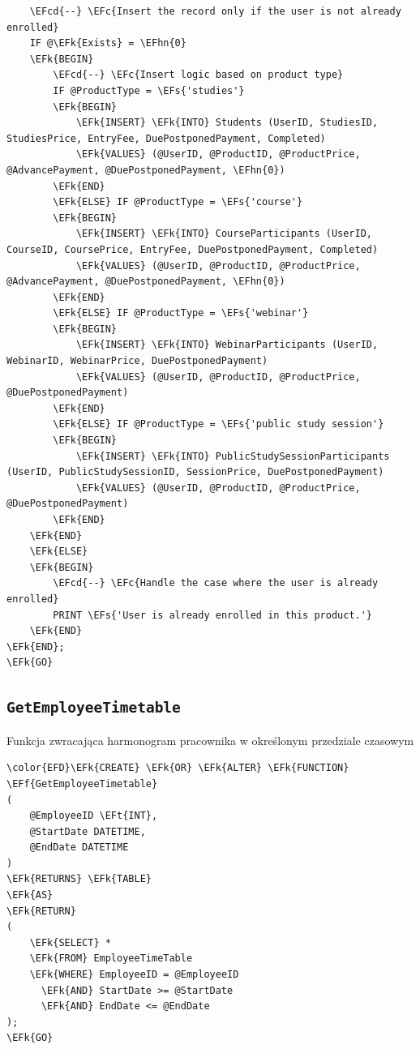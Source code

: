 \documentclass[11pt]{article}
\newcommand{\EFc}[1]{\textcolor{EFc}{\textit{#1}}} %
\newcommand{\EFcd}[1]{\textcolor{EFcd}{\textit{#1}}} %
\newcommand{\EFs}[1]{\textcolor{EFs}{#1}} %
\newcommand{\EFk}[1]{\textcolor{EFk}{\textbf{#1}}} %
\newcommand{\EFf}[1]{\textcolor{EFf}{#1}} %
\newcommand{\EFt}[1]{\textcolor{EFt}{\textbf{#1}}} %
\newcommand{\EFhn}[1]{\textcolor{EFhn}{#1}} %
\begin{document}
\begin{Code}
\begin{Verbatim}
    \EFcd{--} \EFc{Insert the record only if the user is not already enrolled}
    IF @\EFk{Exists} = \EFhn{0}
    \EFk{BEGIN}
        \EFcd{--} \EFc{Insert logic based on product type}
        IF @ProductType = \EFs{'studies'}
        \EFk{BEGIN}
            \EFk{INSERT} \EFk{INTO} Students (UserID, StudiesID, StudiesPrice, EntryFee, DuePostponedPayment, Completed)
            \EFk{VALUES} (@UserID, @ProductID, @ProductPrice, @AdvancePayment, @DuePostponedPayment, \EFhn{0})
        \EFk{END}
        \EFk{ELSE} IF @ProductType = \EFs{'course'}
        \EFk{BEGIN}
            \EFk{INSERT} \EFk{INTO} CourseParticipants (UserID, CourseID, CoursePrice, EntryFee, DuePostponedPayment, Completed)
            \EFk{VALUES} (@UserID, @ProductID, @ProductPrice, @AdvancePayment, @DuePostponedPayment, \EFhn{0})
        \EFk{END}
        \EFk{ELSE} IF @ProductType = \EFs{'webinar'}
        \EFk{BEGIN}
            \EFk{INSERT} \EFk{INTO} WebinarParticipants (UserID, WebinarID, WebinarPrice, DuePostponedPayment)
            \EFk{VALUES} (@UserID, @ProductID, @ProductPrice, @DuePostponedPayment)
        \EFk{END}
        \EFk{ELSE} IF @ProductType = \EFs{'public study session'}
        \EFk{BEGIN}
            \EFk{INSERT} \EFk{INTO} PublicStudySessionParticipants (UserID, PublicStudySessionID, SessionPrice, DuePostponedPayment)
            \EFk{VALUES} (@UserID, @ProductID, @ProductPrice, @DuePostponedPayment)
        \EFk{END}
    \EFk{END}
    \EFk{ELSE}
    \EFk{BEGIN}
        \EFcd{--} \EFc{Handle the case where the user is already enrolled}
        PRINT \EFs{'User is already enrolled in this product.'}
    \EFk{END}
\EFk{END};
\EFk{GO}
\end{Verbatim}
\end{Code}
\subsection{\texttt{GetEmployeeTimetable}}
\label{sec:orgd64d726}
Funkcja zwracająca harmonogram pracownika w określonym przedziale czasowym
\begin{Code}
\begin{Verbatim}
\color{EFD}\EFk{CREATE} \EFk{OR} \EFk{ALTER} \EFk{FUNCTION} \EFf{GetEmployeeTimetable} 
(
    @EmployeeID \EFt{INT},
    @StartDate DATETIME,
    @EndDate DATETIME
)
\EFk{RETURNS} \EFk{TABLE}
\EFk{AS}
\EFk{RETURN} 
(
    \EFk{SELECT} * 
    \EFk{FROM} EmployeeTimeTable
    \EFk{WHERE} EmployeeID = @EmployeeID
      \EFk{AND} StartDate >= @StartDate
      \EFk{AND} EndDate <= @EndDate
);
\EFk{GO}
\end{Verbatim}
\end{Code}
\end{document}
